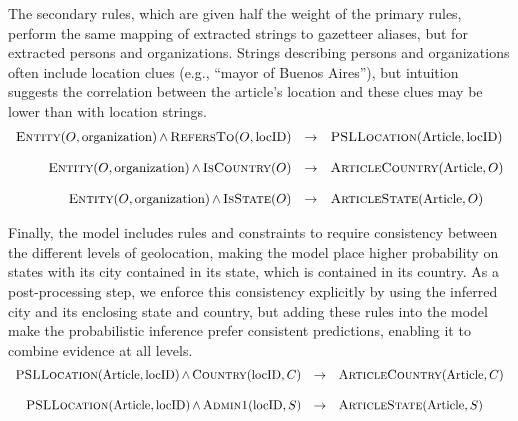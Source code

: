 \documentclass[letterpaper]{article}
\begin{document}
The secondary rules, which are given half the weight of the primary
rules, perform the same mapping of extracted strings to gazetteer
aliases, but for extracted persons and organizations. Strings describing
persons and organizations often include location clues (e.g., ``mayor of
Buenos Aires''), but intuition suggests the correlation between the
article's location and these clues may be lower than with location
strings. 
\begin{equation*}
  \begin{array}{rcl}
  \textsc{Entity}(O, \textrm{organization})  \softand  \textsc{RefersTo}(O, \textrm{locID}) & \rightarrow &  \textsc{PSLLocation}(\textrm{Article},\textrm{locID})\\
  \\
  \textsc{Entity}(O, \textrm{organization}) \softand   \textsc{IsCountry}(O)                & \rightarrow &  \textsc{ArticleCountry}(\textrm{Article}, O)\\
  \\
  \textsc{Entity}(O, \textrm{organization}) \softand \textsc{IsState}(O)                    & \rightarrow & \textsc{ArticleState}(\textrm{Article}, O)\\
  \end{array}
\end{equation*}

Finally, the model includes rules and constraints to require consistency
between the different levels of geolocation, making the model place
higher probability on states with its city contained in its state, which
is contained in its country. As a post-processing step, we enforce this
consistency explicitly by using the inferred city and its enclosing
state and country, but adding these rules into the model make the
probabilistic inference prefer consistent predictions, enabling it to
combine evidence at all levels.
\begin{equation*}
  \begin{array}{rcl}
  \textsc{PSLLocation}(\textrm{Article}, \textrm{locID}) \softand \textsc{Country}(\textrm{locID}, C) & \rightarrow & \textsc{ArticleCountry}(\textrm{Article}, C) \\
  \\
  \textsc{PSLLocation}(\textrm{Article}, \textrm{locID}) \softand \textsc{Admin1}(\textrm{locID}, S)  & \rightarrow & \textsc{ArticleState}(\textrm{Article}, S) \\
  \end{array}
\end{equation*}
\end{document}
